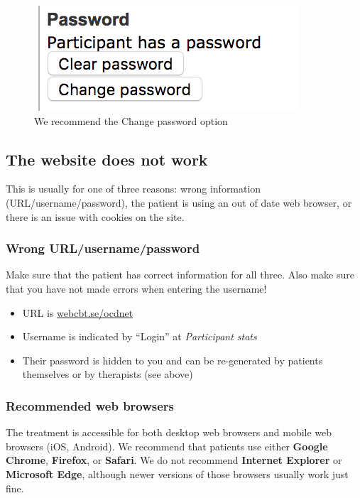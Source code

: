 \documentclass[]{book}
\providecommand{\tightlist}{%
  \setlength{\itemsep}{0pt}\setlength{\parskip}{0pt}}
\theoremstyle{definition}
\theoremstyle{definition}
\theoremstyle{definition}
\theoremstyle{remark}
\begin{document}
\begin{figure}
\centering
\includegraphics{images/change-password.png}
\caption{We recommend the Change password option}
\end{figure}

\hypertarget{the-website-does-not-work}{%
\subsection{The website does not work}\label{the-website-does-not-work}}

This is usually for one of three reasons: wrong information
(URL/username/password), the patient is using an out of date web
browser, or there is an issue with cookies on the site.

\hypertarget{wrong-urlusernamepassword}{%
\subsubsection{Wrong
URL/username/password}\label{wrong-urlusernamepassword}}

Make sure that the patient has correct information for all three. Also
make sure that you have not made errors when entering the username!

\begin{itemize}
\tightlist
\item
  URL is \url{webcbt.se/ocdnet}
\item
  Username is indicated by ``Login'' at \emph{Participant stats}
\item
  Their password is hidden to you and can be re-generated by patients
  themselves or by therapists (see above)
\end{itemize}

\hypertarget{recommended-web-browsers}{%
\subsubsection{Recommended web
browsers}\label{recommended-web-browsers}}

The treatment is accessible for both desktop web browsers and mobile web
browsers (iOS, Android). We recommend that patients use either
\textbf{Google Chrome}, \textbf{Firefox}, or \textbf{Safari}. We do not
recommend \textbf{Internet Explorer} or \textbf{Microsoft Edge},
although newer versions of those browsers usually work just fine.
\end{document}
